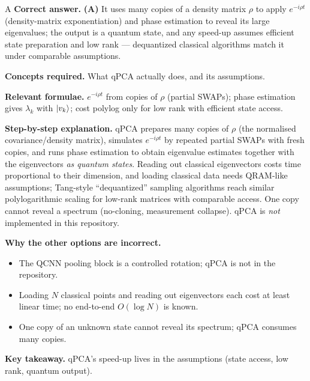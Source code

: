 \documentclass[11pt,a4paper]{article}
\newcommand{\qsep}{\par\vspace{2pt}{\color{black!15}\hrule}\vspace{4pt}}
\begin{document}
\begin{solbox}{A}
\textbf{\color{brand}Correct answer.} \textcolor{okgreen}{\textbf{(A)}} It uses many copies of a density matrix $\rho$ to apply $e^{-i\rho t}$ (density-matrix exponentiation) and phase estimation to reveal its large eigenvalues; the output is a quantum state, and any speed-up assumes efficient state preparation and low rank --- dequantized classical algorithms match it under comparable assumptions.

\textbf{\color{brand}Concepts required.} What qPCA actually does, and its assumptions.

\textbf{\color{brand}Relevant formulae.} $e^{-i\rho t}$ from copies of $\rho$ (partial SWAPs); phase estimation gives $\lambda_k$ with $\ket{v_k}$; cost polylog only for low rank with efficient state access.

\textbf{\color{brand}Step-by-step explanation.} qPCA prepares many copies of $\rho$ (the normalised covariance/density matrix), simulates $e^{-i\rho t}$ by repeated partial SWAPs with
fresh copies, and runs phase estimation to obtain eigenvalue estimates together with the eigenvectors \emph{as quantum states}.
Reading out classical eigenvectors costs time proportional to their dimension, and loading classical data needs QRAM-like assumptions;
Tang-style ``dequantized'' sampling algorithms reach similar polylogarithmic scaling for low-rank matrices with comparable access. One copy
cannot reveal a spectrum (no-cloning, measurement collapse). qPCA is \emph{not} implemented in this repository.

\textbf{\color{brand}Why the other options are incorrect.}
\begin{itemize}[leftmargin=2.4em, itemsep=1pt, topsep=2pt]
\item[\textbf{(B)}] The QCNN pooling block is a controlled rotation; qPCA is not in the repository.
\item[\textbf{(C)}] Loading $N$ classical points and reading out eigenvectors each cost at least linear time; no end-to-end $O(\log N)$ is known.
\item[\textbf{(D)}] One copy of an unknown state cannot reveal its spectrum; qPCA consumes many copies.
\end{itemize}
\textbf{\color{brand}Key takeaway.} qPCA's speed-up lives in the assumptions (state access, low rank, quantum output).
\end{solbox}
\qsep
\end{document}
